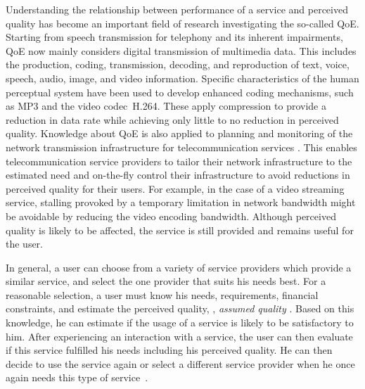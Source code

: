 Understanding the relationship between performance of a service and perceived quality has become an important field of research investigating the so-called \ac{QoE}.
Starting from speech transmission for telephony \citep[][]{ieee_audio_and_electroacoustics_group_ieee_1969} and its inherent impairments, \ac{QoE} now mainly considers digital transmission of multimedia data. %
This includes the production, coding, transmission, decoding, and reproduction of text, voice, speech, audio, image, and video information.
Specific characteristics of the human perceptual system have been used to develop enhanced coding mechanisms, such as \ac{MP3} and the video codec~H.264.
These apply compression to provide a reduction in data rate while achieving only little to no reduction in perceived quality.
Knowledge about \ac{QoE} is also applied to planning and monitoring of the network transmission infrastructure for telecommunication services \citep[][]{schatz_qoe-based_2014}.
This enables telecommunication service providers to tailor their network infrastructure to the estimated need and on-the-fly control their infrastructure to avoid reductions in perceived quality for their users.
For example, in the case of a video streaming service, stalling provoked by a temporary limitation in network bandwidth might be avoidable by reducing the video encoding bandwidth.
Although perceived quality is likely to be affected, the service is still provided and remains useful for the user.

In general, a user can choose from a variety of service providers which provide a similar service, and select the one provider that suits his needs best.
For a reasonable selection, a user must know his needs, requirements, financial constraints, and estimate the perceived quality, \ie, \emph{assumed quality} \citep[][p.\,13]{raake_quality_2014}.
Based on this knowledge, he can estimate if the usage of a service is likely to be satisfactory to  him.
After experiencing an interaction with a service, the user can then evaluate if this service fulfilled his needs including his perceived quality.
He can then decide to use the service again or select a different service provider when he once again needs this type of service~\citep[][]{geerts_linking_2010}.

